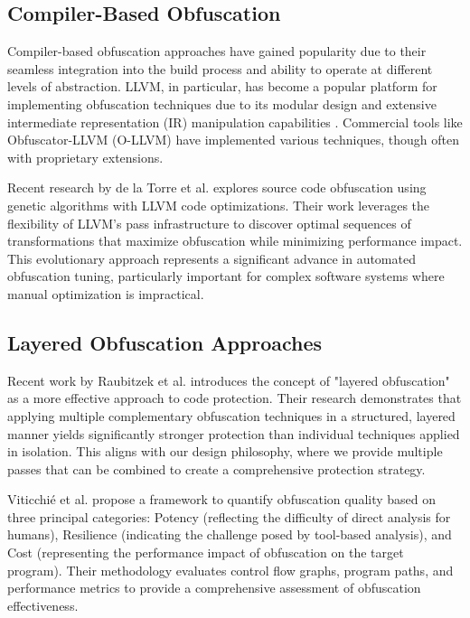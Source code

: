 \documentclass[conference]{IEEEtran}
\begin{document}
\subsection{Compiler-Based Obfuscation}
Compiler-based obfuscation approaches have gained popularity due to their seamless integration into the build process and ability to operate at different levels of abstraction. LLVM, in particular, has become a popular platform for implementing obfuscation techniques due to its modular design and extensive intermediate representation (IR) manipulation capabilities \cite{junod2015obfuscator}. Commercial tools like Obfuscator-LLVM (O-LLVM) have implemented various techniques, though often with proprietary extensions. 

Recent research by de la Torre et al. \cite{delatorre2024genetic} explores source code obfuscation using genetic algorithms with LLVM code optimizations. Their work leverages the flexibility of LLVM's pass infrastructure to discover optimal sequences of transformations that maximize obfuscation while minimizing performance impact. This evolutionary approach represents a significant advance in automated obfuscation tuning, particularly important for complex software systems where manual optimization is impractical.

\subsection{Layered Obfuscation Approaches}
Recent work by Raubitzek et al. \cite{raubitzek2024layered} introduces the concept of "layered obfuscation" as a more effective approach to code protection. Their research demonstrates that applying multiple complementary obfuscation techniques in a structured, layered manner yields significantly stronger protection than individual techniques applied in isolation. This aligns with our design philosophy, where we provide multiple passes that can be combined to create a comprehensive protection strategy.

Viticchié et al. \cite{viticchie2023framework} propose a framework to quantify obfuscation quality based on three principal categories: Potency (reflecting the difficulty of direct analysis for humans), Resilience (indicating the challenge posed by tool-based analysis), and Cost (representing the performance impact of obfuscation on the target program). Their methodology evaluates control flow graphs, program paths, and performance metrics to provide a comprehensive assessment of obfuscation effectiveness.
\end{document}
